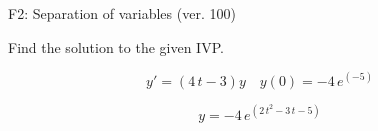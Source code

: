 \begin{exercise}
  \begin{exerciseTitle}F2: Separation of variables (ver. 100)\end{exerciseTitle}
  \begin{exerciseStatement}
    
Find the solution to the given IVP.

    
\[y'=( 4 \, t - 3 )y\hspace{1em} y(0)= -4 \, e^{\left(-5\right)}\]

  \end{exerciseStatement}
  \begin{exerciseAnswer}
    
\[y= -4 \, e^{\left(2 \, t^{2} - 3 \, t - 5\right)}\]

  \end{exerciseAnswer}
\end{exercise}